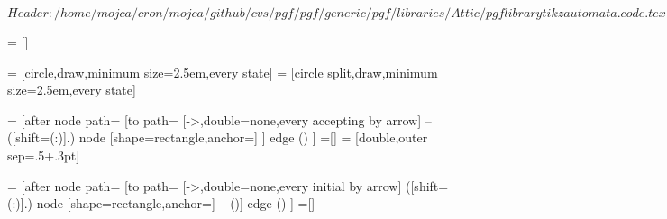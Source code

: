 %
%
%

\ProvidesFileRCS[v\pgfversion] $Header: /home/mojca/cron/mojca/github/cvs/pgf/pgf/generic/pgf/libraries/Attic/pgflibrarytikzautomata.code.tex,v 1.3 2006/10/11 15:22:26 tantau Exp $



=           []

=  [circle,draw,minimum size=2.5em,every state]
=     [circle split,draw,minimum size=2.5em,every state]

=    [after node path=
{
  {
    [to path=
    {
      [->,double=none,every accepting by arrow]
      --
      ([shift=(\tikz@accepting@angle:\tikz@accepting@distance)]\tikztostart.\tikz@accepting@angle)
          node [shape=rectangle,anchor=\tikz@accepting@anchor] {\tikz@accepting@text}
      }]
    edge ()
  }
}]
=[]
= [double,outer sep=.5\pgflinewidth+.3pt] %

=   [after node path=
{
  {
    [to path=
    {
      [->,double=none,every initial by arrow]
      ([shift=(\tikz@initial@angle:\tikz@initial@distance)]\tikztostart.\tikz@initial@angle)
          node [shape=rectangle,anchor=\tikz@initial@anchor] {\tikz@initial@text}
        -- (\tikztostart)}]
    edge ()
  }
}]
=[]





\def\tikz@initial@text{start}
\def\tikz@accepting@text{}

\def\tikz@initial@distance{3ex}
\def\tikz@accepting@distance{3ex}

